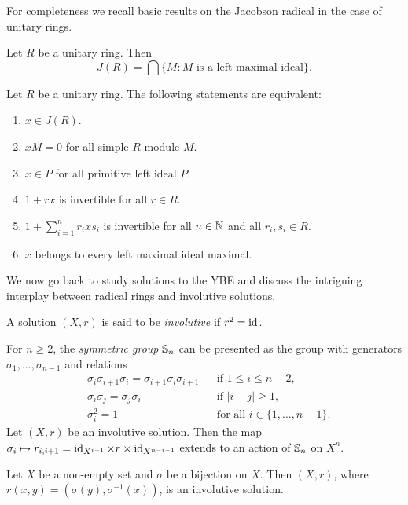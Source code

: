 For completeness we recall basic results on the Jacobson radical in the case
of unitary rings. 

\begin{exercise}
	Let $R$ be a unitary ring. Then  
	\[
	J(R)=\bigcap\{M:\text{$M$ is a left maximal ideal}\}.
	\]
\end{exercise}

\begin{exercise}
	Let $R$ be a unitary ring. The
	following statements are equivalent: 
	\begin{enumerate}
		\item $x\in J(R)$.
		\item $xM=0$ for all simple $R$-module $M$.
		\item $x\in P$ for all primitive left ideal $P$.
		\item $1+rx$ is invertible for all $r\in R$.
		\item $1+\sum_{i=1}^n r_ixs_i$ is invertible for all $n\in\mathbb{N}$ and all $r_i,s_i\in R$.
		\item $x$ belongs to every left maximal ideal maximal. 
	\end{enumerate}
\end{exercise}

We now go back to study solutions to the YBE and discuss the intriguing interplay
between radical rings and involutive solutions. 

\begin{definition}
A solution $(X,r)$ is said to be \emph{involutive} if $r^2=\operatorname{id}$. 
\end{definition}

For $n\geq2$, the \emph{symmetric group} $\mathbb{S}_n$ can be presented 
as the group with generators $\sigma_1,\dots,\sigma_{n-1}$ and relations
\begin{align*}
    &\sigma_i\sigma_{i+1}\sigma_i=\sigma_{i+1}\sigma_i\sigma_{i+1} && \text{if }1\leq i\leq n-2,\\
    &\sigma_i\sigma_j=\sigma_j\sigma_i && \text{if }|i-j|\geq 1,\\
    &\sigma_i^2=1 && \text{for all $i\in\{1,\dots,n-1\}$}.
\end{align*}
Let $(X,r)$ be an involutive solution. 
Then the map $\sigma_i\mapsto r_{i,i+1}=\operatorname{id}_{X^{i-1}}\times r\times\operatorname{id}_{X^{n-i-1}}$ extends 
to an action of $\mathbb{S}_n$ on $X^n$.

\begin{example}
Let $X$ be a non-empty set and $\sigma$ be a bijection on $X$. Then 
$(X,r)$, where $r(x,y)=(\sigma(y),\sigma^{-1}(x))$, is an involutive solution. 
\end{example}

